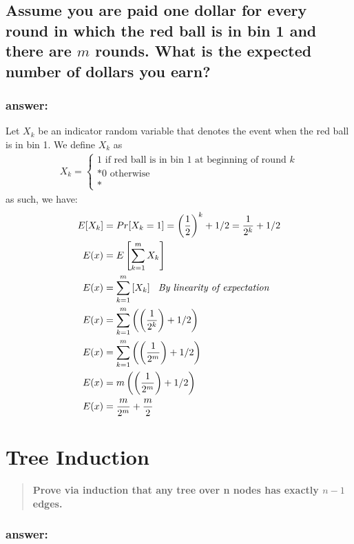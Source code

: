 \documentclass[titlepage]{article}
\theoremstyle{definition}
\begin{document}
  \subsection{Assume you are paid one dollar for every round in which the red
    ball is in bin 1 and there are $m$ rounds. What is the expected number of
    dollars you earn?}
    \subsubsection{answer:}
      Let $X_k$ be an indicator random variable that denotes the event when the red
      ball is in bin 1. We define $X_k$ as 
      \begin{align}
        X_k = \begin{cases} 1 \text{ if red ball is in bin 1 at beginning of round }k \\*
                            0 \text{ otherwise }\\*
        \end{cases}
      \end{align}
      as such, we have:
      \begin{align*}
        E[X_k] &= Pr[X_k = 1] = \left(\frac{1}{2}\right)^k + 1/2  = \frac{1}{2^k} + 1/2 \\*
        E(x) &= E\left[ \sum_{k=1}^m X_k \right] \\*
        E(x) &= \sum_{k=1}^m \left[X_k \right] \text{ \emph{ By linearity of expectation}}\\*
        E(x) &= \sum_{k=1}^m \left( \left( \frac{1}{2^k}\right) + 1/2 \right) \\*
        E(x) &= \sum_{k=1}^m \left( \left( \frac{1}{2^m}\right) + 1/2 \right) \\*
        E(x) &= m \left( \left( \frac{1}{2^m}\right) + 1/2 \right) \\*
        E(x) &= \frac{m}{2^m} + \frac{m}{2}
      \end{align*}


\section{Tree Induction}
\begin{quote}
  \textbf{Prove via induction that any tree over n nodes has exactly $n-1$
  edges. }
\end{quote}

\subsubsection{answer:}
\end{document}
